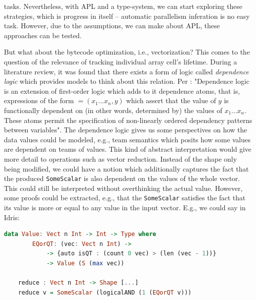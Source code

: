 \documentclass{report}
\begin{document}
tasks. Nevertheless, with APL and a type-system, we can start exploring these strategies, which is progress in itself -- automatic parallelism inferation is no easy task. However, due to the assumptions, we can make about APL, these approaches can be tested.

But what about the bytecode optimization, i.e., vectorization? This comes to the question of the relevance of tracking individual array cell's lifetime. During a literature review, it was found that there exists a form of logic called \emph{dependence logic} which provides models to think about this relation. Per \cite{sep-logic-dependence}: "Dependence logic is an extension of first-order logic which adds to it dependence atoms, that is, expressions of the form $=(x_{1}...x_{n},y)$ which assert that the value of $y$ is functionally dependent on (in other words, determined by) the values of $x_{1}...x_{n}$. These atoms permit the specification of non-linearly ordered dependency patterns between variables". The dependence logic gives us some perspectives on how the data values could be modeled, e.g., team semantics \cite{hodges1997compositional} which posits how some values are dependent on teams of values. This kind of abstract interpretation would give more detail to operations such as vector reduction. Instead of the shape only being modified, we could have a notion which additionally captures the fact that the produced \verb|SomeScalar| is also dependent on the values of the whole vector. This could still be interpreted without overthinking the actual value. However, some proofs could be extracted, e.g., that the \verb|SomeScalar| satisfies the fact that its value is more or equal to any value in the input vector. E.g., we could say in Idris:

\begin{lstlisting}[language=Haskell]
    data Value: Vect n Int -> Int -> Type where
        EQorQT: (vec: Vect n Int) ->
            -> {auto isQT : (count 0 vec) > (len (vec - 1))}
            -> Value (S (max vec))

    reduce : Vect n Int -> Shape [...]
    reduce v = SomeScalar (logicalAND (1 (EQorQT v)))
\end{lstlisting}
\end{document}
